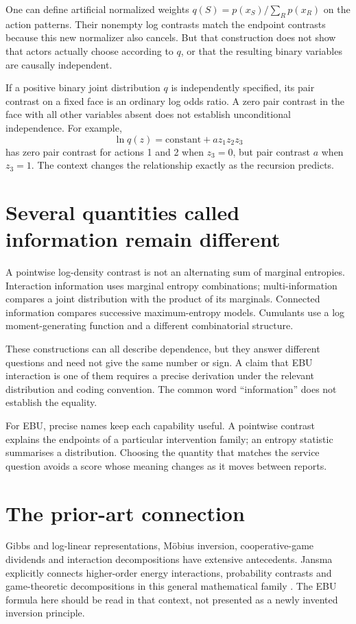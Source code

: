 One can define artificial normalized weights $q(S)=p(x_S)/\sum_Rp(x_R)$ on the action patterns. Their nonempty log contrasts match the endpoint contrasts because this new normalizer also cancels. But that construction does not show that actors actually choose according to $q$, or that the resulting binary variables are causally independent.

If a positive binary joint distribution $q$ is independently specified, its pair contrast on a fixed face is an ordinary log odds ratio. A zero pair contrast in the face with all other variables absent does not establish unconditional independence. For example,
\begin{equation}
 \ln q(z)=\text{constant}+a z_1z_2z_3
\end{equation}
has zero pair contrast for actions 1 and 2 when $z_3=0$, but pair contrast $a$ when $z_3=1$. The context changes the relationship exactly as the recursion predicts.

\section{Several quantities called information remain different}
A pointwise log-density contrast is not an alternating sum of marginal entropies. Interaction information uses marginal entropy combinations; multi-information compares a joint distribution with the product of its marginals. Connected information compares successive maximum-entropy models. Cumulants use a log moment-generating function and a different combinatorial structure.

These constructions can all describe dependence, but they answer different questions and need not give the same number or sign. A claim that EBU interaction is one of them requires a precise derivation under the relevant distribution and coding convention. The common word ``information'' does not establish the equality.

For EBU, precise names keep each capability useful. A pointwise contrast explains the endpoints of a particular intervention family; an entropy statistic summarises a distribution. Choosing the quantity that matches the service question avoids a score whose meaning changes as it moves between reports.

\section{The prior-art connection}
Gibbs and log-linear representations, Möbius inversion, cooperative-game dividends and interaction decompositions have extensive antecedents. Jansma explicitly connects higher-order energy interactions, probability contrasts and game-theoretic decompositions in this general mathematical family \cite{jansma2025,jansma2023}. The EBU formula here should be read in that context, not presented as a newly invented inversion principle.

